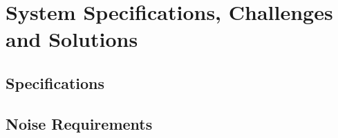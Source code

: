\chapter{System Specifications, Challenges and Solutions}\label{c:specs}

\section{Specifications} \label{sec:ch2-specifications}

\section{Noise Requirements} \label{sec:ch2-noise}
